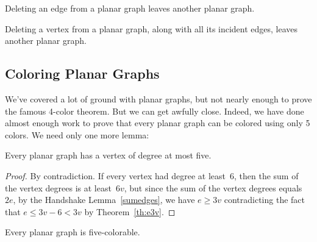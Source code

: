 \begin{editingnotes}

\begin{lemma}\label{lem:deleting_planar_edge}
Deleting an edge from a planar graph leaves another planar graph.
\end{lemma}

\begin{corollary}\label{delete-vertex}
Deleting a vertex from a planar graph, along with all its incident
edges, leaves another planar graph.
\end{corollary}
\end{editingnotes}

\subsection{Coloring Planar Graphs}

We've covered a lot of ground with planar graphs, but not nearly
enough to prove the famous 4-color theorem.  But we can get awfully
close.  Indeed, we have done almost enough work to prove that every
planar graph can be colored using only 5 colors.  We need only one
more lemma:
\begin{lemma}\label{lem:pg5}
Every planar graph has a vertex of degree at most five.
\end{lemma}

\begin{proof}
By contradiction.
If every vertex had degree at least~6, then the sum of the vertex
degrees is at least~$6v$, but since the sum of the vertex degrees
equals~$2e$, by the Handshake Lemma~\ref{sumedges}, we have $e
\ge 3v$ contradicting the fact that $e \le 3v - 6 < 3v$ by
Theorem~\ref{th:e3v}.
\end{proof}

\begin{theorem}
Every planar graph is five-colorable.
\end{theorem}

